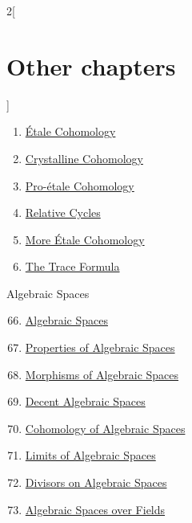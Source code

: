 \begin{multicols}{2}[\section{Other chapters}]
\begin{enumerate}
\item \href{https://github.com/stacks/stacks-project/blob/a04446e57ec1fbc252a871afcec7752fb2807b14/etale-cohomology.tex}{\'Etale Cohomology}
\item \href{https://github.com/stacks/stacks-project/blob/a04446e57ec1fbc252a871afcec7752fb2807b14/crystalline.tex}{Crystalline Cohomology}
\item \href{https://github.com/stacks/stacks-project/blob/a04446e57ec1fbc252a871afcec7752fb2807b14/proetale.tex}{Pro-\'etale Cohomology}
\item \href{https://github.com/stacks/stacks-project/blob/a04446e57ec1fbc252a871afcec7752fb2807b14/relative-cycles.tex}{Relative Cycles}
\item \href{https://github.com/stacks/stacks-project/blob/a04446e57ec1fbc252a871afcec7752fb2807b14/more-etale.tex}{More \'Etale Cohomology}
\item \href{https://github.com/stacks/stacks-project/blob/a04446e57ec1fbc252a871afcec7752fb2807b14/trace.tex}{The Trace Formula}
\end{enumerate}
Algebraic Spaces
\begin{enumerate}
\setcounter{enumi}{65}
\item \href{https://github.com/stacks/stacks-project/blob/a04446e57ec1fbc252a871afcec7752fb2807b14/spaces.tex}{Algebraic Spaces}
\item \href{https://github.com/stacks/stacks-project/blob/a04446e57ec1fbc252a871afcec7752fb2807b14/spaces-properties.tex}{Properties of Algebraic Spaces}
\item \href{https://github.com/stacks/stacks-project/blob/a04446e57ec1fbc252a871afcec7752fb2807b14/spaces-morphisms.tex}{Morphisms of Algebraic Spaces}
\item \href{https://github.com/stacks/stacks-project/blob/a04446e57ec1fbc252a871afcec7752fb2807b14/decent-spaces.tex}{Decent Algebraic Spaces}
\item \href{https://github.com/stacks/stacks-project/blob/a04446e57ec1fbc252a871afcec7752fb2807b14/spaces-cohomology.tex}{Cohomology of Algebraic Spaces}
\item \href{https://github.com/stacks/stacks-project/blob/a04446e57ec1fbc252a871afcec7752fb2807b14/spaces-limits.tex}{Limits of Algebraic Spaces}
\item \href{https://github.com/stacks/stacks-project/blob/a04446e57ec1fbc252a871afcec7752fb2807b14/spaces-divisors.tex}{Divisors on Algebraic Spaces}
\item \href{https://github.com/stacks/stacks-project/blob/a04446e57ec1fbc252a871afcec7752fb2807b14/spaces-over-fields.tex}{Algebraic Spaces over Fields}

\end{enumerate}
\end{multicols}
